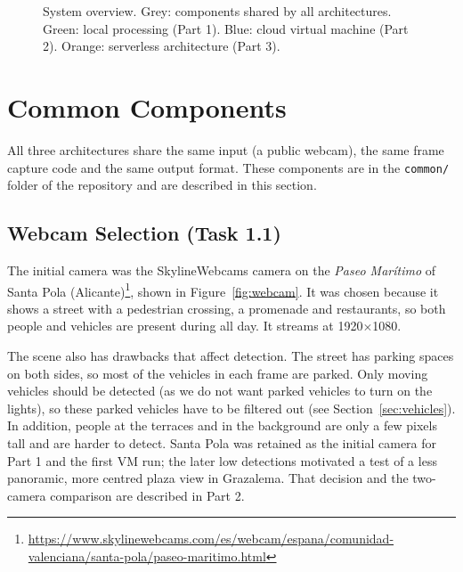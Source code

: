 \documentclass{article}
\begin{document}
\begin{figure}[h]
{%
      }
      \caption{System overview. Grey: components shared by all architectures. Green: local processing (Part 1). Blue: cloud virtual machine (Part 2). Orange: serverless architecture (Part 3).}
      \label{fig:overview}
    \end{figure}


\section{Common Components}

All three architectures share the same input (a public webcam), the same frame capture code and the same output format. These components are in the \texttt{common/} folder of the repository and are described in this section.

    \subsection{Webcam Selection (Task 1.1)}

    The initial camera was the SkylineWebcams camera on the \emph{Paseo Marítimo} of Santa Pola (Alicante)\footnote{\url{https://www.skylinewebcams.com/es/webcam/espana/comunidad-valenciana/santa-pola/paseo-maritimo.html}}, shown in Figure~\ref{fig:webcam}. It was chosen because it shows a street with a pedestrian crossing, a promenade and restaurants, so both people and vehicles are present during all day. It streams at 1920$\times$1080.

    The scene also has drawbacks that affect detection. The street has parking spaces on both sides, so most of the vehicles in each frame are parked. Only moving vehicles should be detected (as we do not want parked vehicles to turn on the lights), so these parked vehicles have to be filtered out (see Section~\ref{sec:vehicles}). In addition, people at the terraces and in the background are only a few pixels tall and are harder to detect. Santa Pola was retained as the initial camera for Part 1 and the first VM run; the later low detections motivated a test of a less panoramic, more centred plaza view in Grazalema. That decision and the two-camera comparison are described in Part 2.
\end{document}
